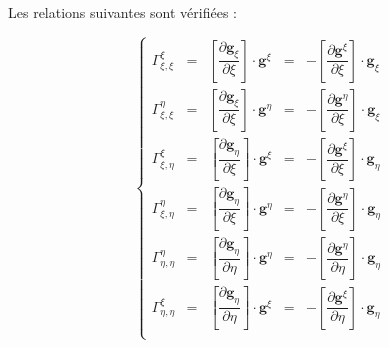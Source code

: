\begin{proposition}
Les relations suivantes sont vérifiées :

\begin{equation}
\left\lbrace
\begin{array}{rcccl}
\Gamma_{\xi,\xi}^{\xi} & = & \left[ \dfrac{\partial \mathbf{g}_{\xi}}{\partial \xi} \right] \cdot \mathbf{g}^{\xi} & = & - \left[ \dfrac{\partial \mathbf{g}^{\xi}}{\partial \xi} \right] \cdot \mathbf{g}_ {\xi}\\

\Gamma_{\xi,\xi}^{\eta} & = & \left[ \dfrac{\partial \mathbf{g}_{\xi}}{\partial \xi} \right] \cdot \mathbf{g}^{\eta} & = & - \left[ \dfrac{\partial \mathbf{g}^{\eta}}{\partial \xi} \right] \cdot \mathbf{g}_ {\xi}\\

\Gamma_{\xi,\eta}^{\xi} & = & \left[ \dfrac{\partial \mathbf{g}_{\eta}}{\partial \xi} \right] \cdot \mathbf{g}^{\xi} & = & - \left[ \dfrac{\partial \mathbf{g}^{\xi}}{\partial \xi} \right] \cdot \mathbf{g}_ {\eta}\\

\Gamma_{\xi,\eta}^{\eta} & = & \left[ \dfrac{\partial \mathbf{g}_{\eta}}{\partial \xi} \right] \cdot \mathbf{g}^{\eta} & = & - \left[ \dfrac{\partial \mathbf{g}^{\eta}}{\partial \xi} \right] \cdot \mathbf{g}_ {\eta}\\

\Gamma_{\eta,\eta}^{\eta} & = & \left[ \dfrac{\partial \mathbf{g}_{\eta}}{\partial \eta} \right] \cdot \mathbf{g}^{\eta} & = & - \left[ \dfrac{\partial \mathbf{g}^{\eta}}{\partial \eta} \right] \cdot \mathbf{g}_ {\eta}\\

\Gamma_{\eta,\eta}^{\xi} & = & \left[ \dfrac{\partial \mathbf{g}_{\eta}}{\partial \eta} \right] \cdot \mathbf{g}^{\xi} & = & - \left[ \dfrac{\partial \mathbf{g}^{\xi}}{\partial \eta} \right] \cdot \mathbf{g}_ {\eta}\\
\end{array}
\right.
\end{equation}
\end{proposition}

